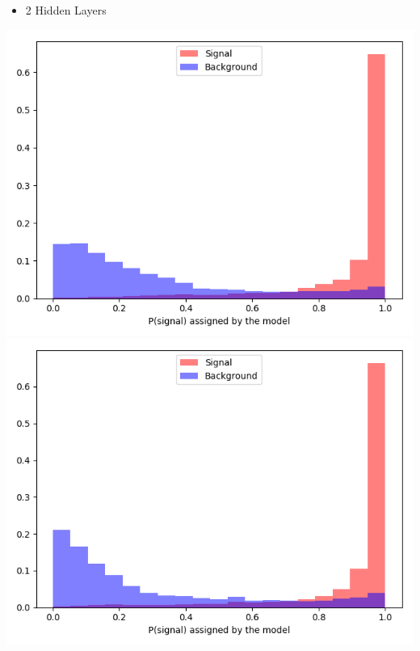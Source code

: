 \documentclass[10pt]{beamer}
\begin{document}
{\begin{columns}
\begin{column}{0.48\textwidth}
\begin{itemize}
\item 2 Hidden Layers
\end{itemize}
\includegraphics[width=.85\textwidth]{SmallNpart1modelouts/ejetsboth2hidnpart0sigbkg.png} \\
\includegraphics[width=.85\textwidth]{SmallNpart1modelouts/ejetsboth2hidnpart1sigbkg.png}
\end{column}
\end{columns}
}
\end{document}
